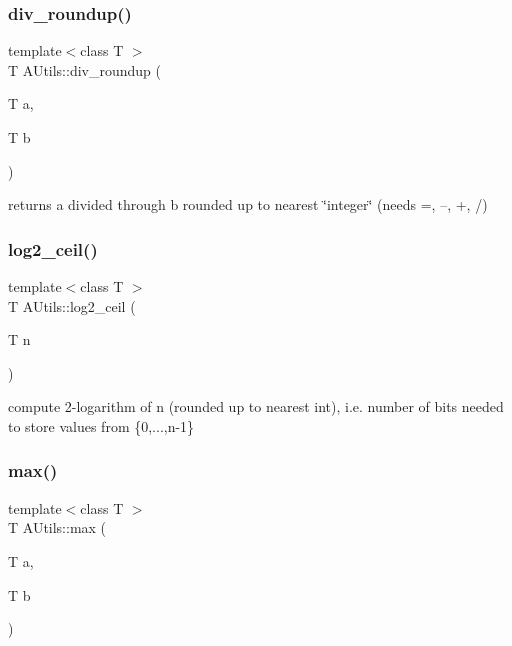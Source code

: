 \mbox{\label{classAUtils_a447da3912ebadf1c8e387c41b8564d21}} 
\subsubsection{div\+\_\+roundup()}
{\footnotesize\ttfamily template$<$class T $>$ \\
T A\+Utils\+::div\+\_\+roundup (\begin{DoxyParamCaption}\item[{T}]{a,  }\item[{T}]{b }\end{DoxyParamCaption})\hspace{0.3cm}{\ttfamily [static]}}

returns a divided through b rounded up to nearest \char`\"{}integer\char`\"{} (needs =, --, +, /) \mbox{\label{classAUtils_a139c8f7686c2d57cbac08bb875612eee}} 
\subsubsection{log2\+\_\+ceil()}
{\footnotesize\ttfamily template$<$class T $>$ \\
T A\+Utils\+::log2\+\_\+ceil (\begin{DoxyParamCaption}\item[{T}]{n }\end{DoxyParamCaption})\hspace{0.3cm}{\ttfamily [static]}}

compute 2-\/logarithm of n (rounded up to nearest int), i.\+e. number of bits needed to store values from \{0,...,n-\/1\} \mbox{\label{classAUtils_a78af5cdca7b9ad8f5bda06e1a16f62be}} 
\subsubsection{max()}
{\footnotesize\ttfamily template$<$class T $>$ \\
T A\+Utils\+::max (\begin{DoxyParamCaption}\item[{T}]{a,  }\item[{T}]{b }\end{DoxyParamCaption})\hspace{0.3cm}{\ttfamily [static]}}

